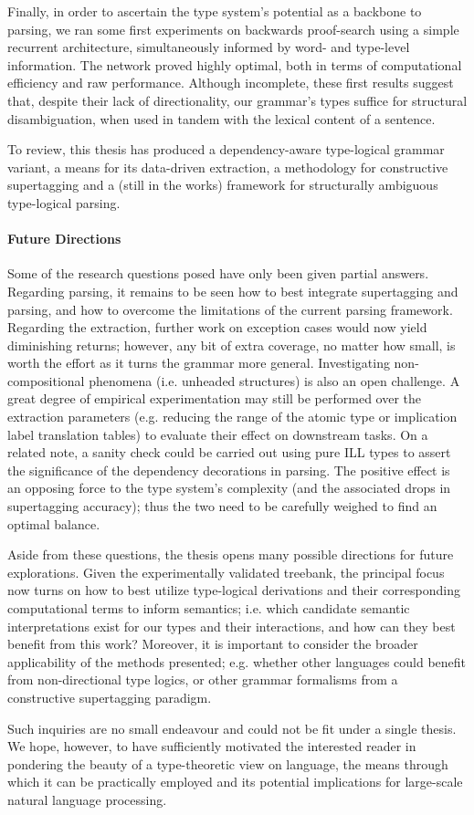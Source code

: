 Finally, in order to ascertain the type system's potential as a backbone to parsing, we ran some first experiments on backwards proof-search using a simple recurrent architecture, simultaneously informed by word- and type-level information.
The network proved highly optimal, both in terms of computational efficiency and raw performance.
Although incomplete, these first results suggest that, despite their lack of directionality, our grammar's types suffice for structural disambiguation, when used in tandem with the lexical content of a sentence.

To review, this thesis has produced a dependency-aware type-logical grammar variant, a means for its data-driven extraction, a methodology for constructive supertagging and a (still in the works) framework for structurally ambiguous type-logical parsing.

\paragraph{Future Directions}
Some of the research questions posed have only been given partial answers.
Regarding parsing, it remains to be seen how to best integrate supertagging and parsing, and how to overcome the limitations of the current parsing framework.
Regarding the extraction, further work on exception cases would now yield diminishing returns; however, any bit of extra coverage, no matter how small, is worth the effort as it turns the grammar more general.
Investigating non-compositional phenomena (i.e. unheaded structures) is also an open challenge.
A great degree of empirical experimentation may still be performed over the extraction parameters (e.g. reducing the range of the atomic type or implication label translation tables) to evaluate their effect on downstream tasks.
On a related note, a sanity check could be carried out using pure ILL types to assert the significance of the dependency decorations in parsing.
The positive effect is an opposing force to the type system's complexity (and the associated drops in supertagging accuracy); thus the two need to be carefully weighed to find an optimal balance.

Aside from these questions, the thesis opens many possible directions for future explorations.
Given the experimentally validated treebank, the principal focus now turns on how to best utilize type-logical derivations and their corresponding computational terms to inform semantics; i.e. which candidate semantic interpretations exist for our types and their interactions, and how can they best benefit from this work?
Moreover, it is important to consider the broader applicability of the methods presented; e.g. whether other languages could benefit from non-directional type logics, or other grammar formalisms from a constructive supertagging paradigm.

Such inquiries are no small endeavour and could not be fit under a single thesis.
We hope, however, to have sufficiently motivated the interested reader in pondering the beauty of a type-theoretic view on language, the means through which it can be practically employed and its potential implications for large-scale natural language processing.